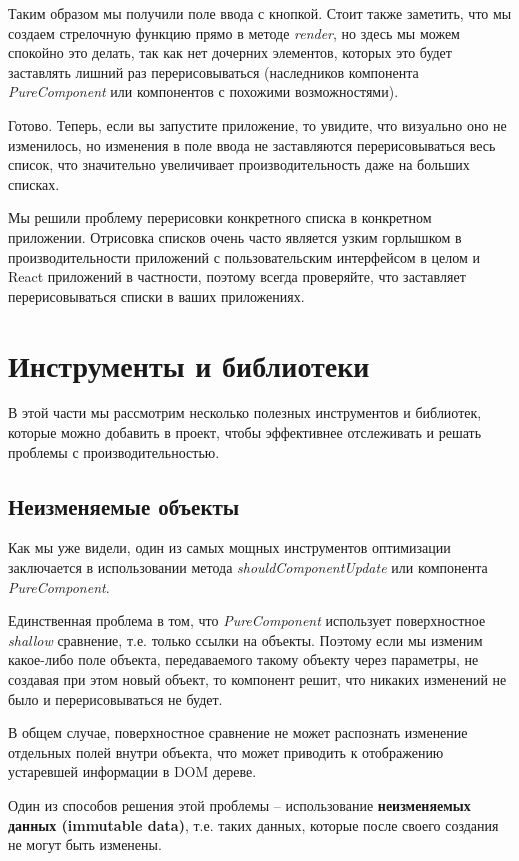 Таким образом мы получили поле ввода с кнопкой. Стоит также заметить, что мы создаем стрелочную функцию прямо в методе \textit{render}, но здесь мы можем спокойно это делать, так как нет дочерних элементов, которых это будет заставлять лишний раз перерисовываться (наследников компонента \textit{PureComponent} или компонентов с похожими возможностями).

Готово. Теперь, если вы запустите приложение, то увидите, что визуально оно не изменилось, но изменения в поле ввода не заставляются перерисовываться весь список, что значительно увеличивает производительность даже на больших списках.

Мы решили проблему перерисовки конкретного списка в конкретном приложении. Отрисовка списков очень часто является узким горлышком в производительности приложений с пользовательским интерфейсом в целом и React приложений в частности, поэтому всегда проверяйте, что заставляет перерисовываться списки в ваших приложениях.

\section{Инструменты и библиотеки}

В этой части мы рассмотрим несколько полезных инструментов и библиотек, которые можно добавить в проект, чтобы эффективнее отслеживать и решать проблемы с производительностью.

\subsection{Неизменяемые объекты}

Как мы уже видели, один из самых мощных инструментов оптимизации заключается в использовании метода \textit{shouldComponentUpdate} или компонента \textit{PureComponent}.

Единственная проблема в том, что \textit{PureComponent} использует поверхностное \textit{shallow} сравнение, т.е. только ссылки на объекты. Поэтому если мы изменим какое-либо поле объекта, передаваемого такому объекту через параметры, не создавая при этом новый объект, то компонент решит, что никаких изменений не было и перерисовываться не будет.

В общем случае, поверхностное сравнение не может распознать изменение отдельных полей внутри объекта, что может приводить к отображению устаревшей информации в DOM дереве.

Один из способов решения этой проблемы -- использование \textbf{неизменяемых данных (immutable data)}, т.е. таких данных, которые после своего создания не могут быть изменены.


